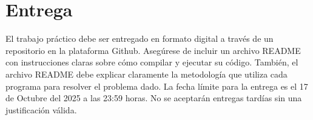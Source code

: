 \documentclass[letterpaper,11pt]{article}
\theoremstyle{plain}
\begin{document}
\section*{Entrega}
El trabajo práctico debe ser entregado en formato digital a través de un repositorio en la plataforma Github. Asegúrese de incluir un archivo README con instrucciones claras sobre cómo compilar y ejecutar su código. También, el archivo README debe explicar claramente la metodología que utiliza cada programa para resolver el problema dado. La fecha límite para la entrega es el 17 de Octubre del 2025 a las 23:59 horas. No se aceptarán entregas tardías sin una justificación válida.
\end{document}
